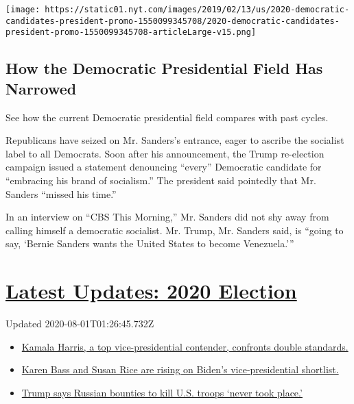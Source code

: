 \href{https://www.nytimes.com/interactive/2019/02/14/us/politics/2020-democratic-candidates-president.html}{}

\texttt{[image: https://static01.nyt.com/images/2019/02/13/us/2020-democratic-candidates-president-promo-1550099345708/2020-democratic-candidates-president-promo-1550099345708-articleLarge-v15.png]}

\hypertarget{how-the-democratic-presidential-field-has-narrowed}{%
\subsection{How the Democratic Presidential Field Has
Narrowed}\label{how-the-democratic-presidential-field-has-narrowed}}

See how the current Democratic presidential field compares with past
cycles.

Republicans have seized on Mr. Sanders's entrance, eager to ascribe the
socialist label to all Democrats. Soon after his announcement, the Trump
re-election campaign issued a statement denouncing ``every'' Democratic
candidate for ``embracing his brand of socialism.'' The president said
pointedly that Mr. Sanders ``missed his time.''

In an interview on ``CBS This Morning,'' Mr. Sanders did not shy away
from calling himself a democratic socialist. Mr. Trump, Mr. Sanders
said, is ``going to say, `Bernie Sanders wants the United States to
become Venezuela.'''

\hypertarget{latest-updates-2020-election}{%
\section{\texorpdfstring{\href{https://www.nytimes.com/2020/07/31/us/elections/biden-vs-trump.html?action=click\&pgtype=Article\&state=default\&region=MAIN_CONTENT_1\&context=storylines_live_updates}{Latest
Updates: 2020
Election}}{Latest Updates: 2020 Election}}\label{latest-updates-2020-election}}

Updated 2020-08-01T01:26:45.732Z

\begin{itemize}
\tightlist
\item
  \href{https://www.nytimes.com/2020/07/31/us/elections/biden-vs-trump.html?action=click\&pgtype=Article\&state=default\&region=MAIN_CONTENT_1\&context=storylines_live_updates\#link-29fdff45}{Kamala
  Harris, a top vice-presidential contender, confronts double
  standards.}
\item
  \href{https://www.nytimes.com/2020/07/31/us/elections/biden-vs-trump.html?action=click\&pgtype=Article\&state=default\&region=MAIN_CONTENT_1\&context=storylines_live_updates\#link-13ec3d9c}{Karen
  Bass and Susan Rice are rising on Biden's vice-presidential
  shortlist.}
\item
  \href{https://www.nytimes.com/2020/07/31/us/elections/biden-vs-trump.html?action=click\&pgtype=Article\&state=default\&region=MAIN_CONTENT_1\&context=storylines_live_updates\#link-49e9a016}{Trump
  says Russian bounties to kill U.S. troops `never took place.'}
\end{itemize}

